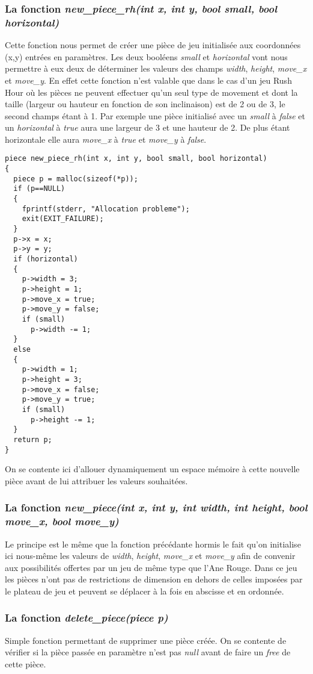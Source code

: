 \documentclass{report}
\begin{document}
\subsubsection*{La fonction \textit{new\_piece\_rh(int x, int y, bool small, bool horizontal)}}
Cette fonction nous permet de créer une pièce de jeu initialisée aux coordonnées (x,y) entrées en paramètres. Les deux booléens \textit{small} et \textit{horizontal} vont nous permettre à eux deux de déterminer les valeurs des champs \textit{width}, \textit{height}, \textit{move\_x} et \textit{move\_y}. En effet cette fonction n'est valable que dans le cas d'un jeu Rush Hour où les pièces ne peuvent effectuer qu'un seul type de movement et dont la taille (largeur ou hauteur en fonction de son inclinaison) est de 2 ou de 3, le second champs étant à 1. Par exemple une pièce initialisé avec un \textit{small} à \textit{false} et un \textit{horizontal} à \textit{true} aura une largeur de 3 et une hauteur de 2. De plus étant horizontale elle aura \textit{move\_x} à \textit{true} et \textit{move\_y} à \textit{false}.
\begin{lstlisting}
piece new_piece_rh(int x, int y, bool small, bool horizontal)
{
  piece p = malloc(sizeof(*p));
  if (p==NULL)
  {
    fprintf(stderr, "Allocation probleme");
    exit(EXIT_FAILURE);
  }
  p->x = x;
  p->y = y;
  if (horizontal)
  {
    p->width = 3;
    p->height = 1;
    p->move_x = true;
    p->move_y = false;
    if (small)
      p->width -= 1;
  }
  else
  {
    p->width = 1;
    p->height = 3;
    p->move_x = false;
    p->move_y = true;
    if (small)
      p->height -= 1;
  }
  return p;
}
\end{lstlisting}
On se contente ici d'allouer dynamiquement un espace mémoire à cette nouvelle pièce avant de lui attribuer les valeurs souhaitées.
\subsubsection*{La fonction \textit{new\_piece(int x, int y, int width, int height, bool move\_x, bool move\_y)}}
Le principe est le même que la fonction précédante hormis le fait qu'on initialise ici nous-même les valeurs de \textit{width}, \textit{height}, \textit{move\_x} et \textit{move\_y} afin de convenir aux possibilités offertes par un jeu de même type que l'Ane Rouge. Dans ce jeu les pièces n'ont pas de restrictions de dimension en dehors de celles imposées par le plateau de jeu et peuvent se déplacer à la fois en abscisse et en ordonnée.
\subsubsection*{La fonction \textit{delete\_piece(piece p)}}
Simple fonction permettant de supprimer une pièce créée. On se contente de vérifier si la pièce passée en paramètre n'est pas \textit{null} avant de faire un \textit{free} de cette pièce.
\end{document}
